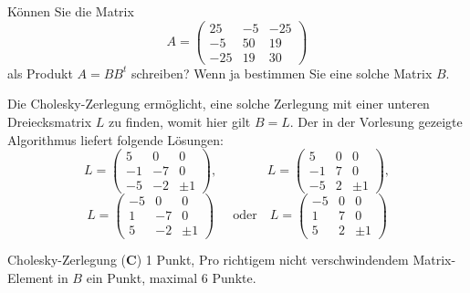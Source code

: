 Können Sie die Matrix 
\[
A
=
\begin{pmatrix}
 25& -5& -25\\
 -5& 50&  19\\
-25& 19&  30
\end{pmatrix}
\]
als Produkt $A=BB^t$ schreiben?
Wenn ja bestimmen Sie eine solche Matrix $B$.


\begin{loesung}
Die Cholesky-Zerlegung ermöglicht, eine solche Zerlegung 
mit einer unteren Dreiecksmatrix $L$ zu finden, womit hier gilt $B = L$. 
Der in der Vorlesung gezeigte Algorithmus liefert folgende Lösungen:
\[
L=\begin{pmatrix}
   5&  0&  0\\
  -1& -7&  0\\
  -5& -2& \pm 1
\end{pmatrix},
\quad\phantom{\text{oder}}\quad
L=\begin{pmatrix}
   5&  0&  0\\
  -1&  7&  0\\
  -5&  2& \pm 1
\end{pmatrix},
\]
\[
L=\begin{pmatrix}
  -5&  0&  0\\
   1& -7&  0\\
   5& -2& \pm 1
\end{pmatrix}\phantom{,}
\quad\text{oder}\quad
L=\begin{pmatrix}
  -5&  0&  0\\
   1&  7&  0\\
   5&  2& \pm 1
\end{pmatrix}
\]

\end{loesung}

\begin{bewertung}
Cholesky-Zerlegung ({\bf C}) 1 Punkt, Pro richtigem nicht verschwindendem Matrix-Element in $B$ ein
Punkt, maximal 6 Punkte.
\end{bewertung}
